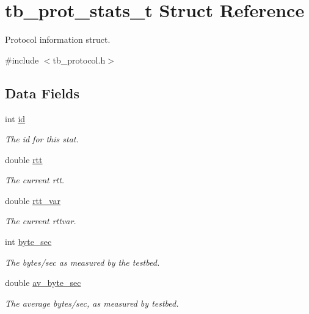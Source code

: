 \hypertarget{structtb__prot__stats__t}{\section{tb\-\_\-prot\-\_\-stats\-\_\-t Struct Reference}
\label{structtb__prot__stats__t}
}


Protocol information struct.  




{\ttfamily \#include $<$tb\-\_\-protocol.\-h$>$}

\subsection*{Data Fields}
\begin{DoxyCompactItemize}
\item 
int \hyperlink{structtb__prot__stats__t_a7441ef0865bcb3db9b8064dd7375c1ea}{id}
\begin{DoxyCompactList}\small\item\em The id for this stat. \end{DoxyCompactList}\item 
double \hyperlink{structtb__prot__stats__t_abc953dca5930a67736d6cd8f72353794}{rtt}
\begin{DoxyCompactList}\small\item\em The current rtt. \end{DoxyCompactList}\item 
double \hyperlink{structtb__prot__stats__t_adef6e52b2e3ac2f1f1369e40f3f515e3}{rtt\-\_\-var}
\begin{DoxyCompactList}\small\item\em The current rttvar. \end{DoxyCompactList}\item 
int \hyperlink{structtb__prot__stats__t_a69f2a2630fbc05fb4fd41fb24459e9c6}{byte\-\_\-sec}
\begin{DoxyCompactList}\small\item\em The bytes/sec as measured by the testbed. \end{DoxyCompactList}\item 
double \hyperlink{structtb__prot__stats__t_afcb119a75ab6e472c10bac8ccb627517}{av\-\_\-byte\-\_\-sec}
\begin{DoxyCompactList}\small\item\em The average bytes/sec, as measured by testbed. \end{DoxyCompactList}\item 

\end{DoxyCompactItemize}

